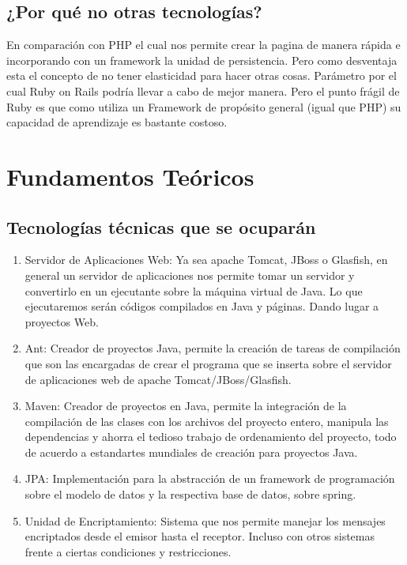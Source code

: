 \documentclass[a4paper,12pt,openany,oneside]{book}
\begin{document}
\subsection{¿Por qué no otras tecnologías?}
En comparación con PHP el cual nos permite crear la pagina de manera rápida e incorporando con un framework la unidad de persistencia. Pero como desventaja esta el concepto de no tener elasticidad para hacer otras cosas. Parámetro por el cual Ruby on Rails podría llevar a cabo de mejor manera. Pero el punto frágil de Ruby es que como utiliza un Framework de propósito general (igual que PHP) su capacidad de aprendizaje es bastante costoso. 
\section{Fundamentos Teóricos}
\subsection{Tecnologías técnicas que se ocuparán}
\begin{enumerate}
\item Servidor de Aplicaciones Web: Ya sea apache Tomcat, JBoss o Glasfish, en general un servidor de aplicaciones nos permite tomar un servidor y convertirlo en un ejecutante sobre la máquina virtual de Java. Lo que ejecutaremos serán códigos compilados en Java y páginas. Dando lugar a proyectos Web.
\item Ant: Creador de proyectos Java, permite la creación de tareas de compilación que son las encargadas de crear el programa que se inserta sobre el servidor de aplicaciones web de apache Tomcat/JBoss/Glasfish.
\item Maven: Creador de proyectos en Java, permite la integración de la compilación de las clases con los archivos del proyecto entero, manipula las dependencias y ahorra el tedioso trabajo de ordenamiento del proyecto, todo de acuerdo a estandartes mundiales de creación para proyectos Java.
\item JPA: Implementación para la abstracción de un framework de programación sobre el modelo de datos y la respectiva base de datos, sobre spring.
\item Unidad de Encriptamiento: Sistema que nos permite manejar los mensajes encriptados desde el emisor hasta el receptor. Incluso con otros sistemas frente a ciertas condiciones y restricciones.
\end{enumerate}
\end{document}
